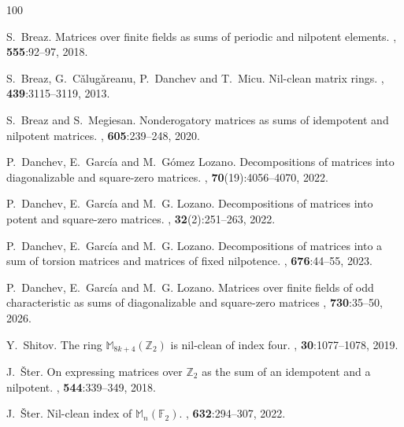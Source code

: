 \documentclass{amsart}
\theoremstyle{definition}
\theoremstyle{remark}
\numberwithin{equation}{section}
\begin{document}
\begin{thebibliography}{100}

S.~Breaz.
\newblock Matrices over finite fields as sums of periodic and nilpotent elements.
, {\bf 555}:92--97, 2018.

S.~Breaz, G.~C\v{a}lug\v{a}reanu, P.~Danchev and T.~Micu.
\newblock Nil-clean matrix rings.
, {\bf 439}:3115--3119, 2013.

S.~Breaz and S.~Megiesan.
\newblock Nonderogatory matrices as sums of idempotent and nilpotent matrices.
, {\bf 605}:239--248, 2020.

P.~Danchev, E.~Garc\'ia and M.~G\'omez Lozano.
\newblock Decompositions of matrices into diagonalizable and square-zero matrices.
, {\bf 70}(19):4056--4070, 2022.

P.~Danchev, E.~Garc\'ia and M.~G. Lozano.
\newblock Decompositions of matrices into potent and square-zero matrices.
, {\bf 32}(2):251--263, 2022.

P.~Danchev, E.~Garc\'ia and M.~G. Lozano.
\newblock Decompositions of matrices into a sum of torsion matrices and matrices of fixed nilpotence.
, {\bf 676}:44--55, 2023.

P.~Danchev, E.~Garc\'ia and M.~G. Lozano.
\newblock Matrices over finite fields of odd characteristic as sums of diagonalizable and square-zero matrices
, {\bf 730}:35--50, 2026.

Y.~Shitov.
\newblock The ring $\mathbb{M}_{8k+4}(\mathbb{Z}_2)$ is nil-clean of index four.
, {\bf 30}:1077--1078, 2019.

J.~\v{S}ter.
\newblock On expressing matrices over $\mathbb{Z}_2$ as the sum of an idempotent and a nilpotent.
, {\bf 544}:339--349, 2018.

J.~\v{S}ter.
\newblock Nil-clean index of $\mathbb{M}_n(\mathbb{F}_2)$.
, {\bf 632}:294--307, 2022.

\end{thebibliography}
\end{document}
